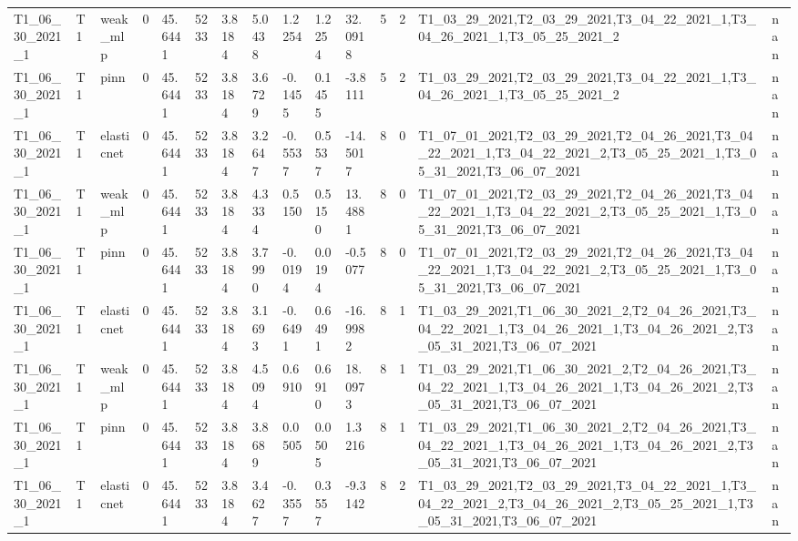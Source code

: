 \begin{table}[t]
\begin{tabular}{lllllllllllllll}
T1\_06\_30\_2021\_1 & T1 & weak\_mlp & 0 & 45.6441 & 5233 & 3.8184 & 5.0438 & 1.2254 & 1.2254 & 32.0918 & 5 & 2 & T1\_03\_29\_2021,T2\_03\_29\_2021,T3\_04\_22\_2021\_1,T3\_04\_26\_2021\_1,T3\_05\_25\_2021\_2 & nan \\
T1\_06\_30\_2021\_1 & T1 & pinn & 0 & 45.6441 & 5233 & 3.8184 & 3.6729 & -0.1455 & 0.1455 & -3.8111 & 5 & 2 & T1\_03\_29\_2021,T2\_03\_29\_2021,T3\_04\_22\_2021\_1,T3\_04\_26\_2021\_1,T3\_05\_25\_2021\_2 & nan \\
T1\_06\_30\_2021\_1 & T1 & elasticnet & 0 & 45.6441 & 5233 & 3.8184 & 3.2647 & -0.5537 & 0.5537 & -14.5017 & 8 & 0 & T1\_07\_01\_2021,T2\_03\_29\_2021,T2\_04\_26\_2021,T3\_04\_22\_2021\_1,T3\_04\_22\_2021\_2,T3\_05\_25\_2021\_1,T3\_05\_31\_2021,T3\_06\_07\_2021 & nan \\
T1\_06\_30\_2021\_1 & T1 & weak\_mlp & 0 & 45.6441 & 5233 & 3.8184 & 4.3334 & 0.5150 & 0.5150 & 13.4881 & 8 & 0 & T1\_07\_01\_2021,T2\_03\_29\_2021,T2\_04\_26\_2021,T3\_04\_22\_2021\_1,T3\_04\_22\_2021\_2,T3\_05\_25\_2021\_1,T3\_05\_31\_2021,T3\_06\_07\_2021 & nan \\
T1\_06\_30\_2021\_1 & T1 & pinn & 0 & 45.6441 & 5233 & 3.8184 & 3.7990 & -0.0194 & 0.0194 & -0.5077 & 8 & 0 & T1\_07\_01\_2021,T2\_03\_29\_2021,T2\_04\_26\_2021,T3\_04\_22\_2021\_1,T3\_04\_22\_2021\_2,T3\_05\_25\_2021\_1,T3\_05\_31\_2021,T3\_06\_07\_2021 & nan \\
T1\_06\_30\_2021\_1 & T1 & elasticnet & 0 & 45.6441 & 5233 & 3.8184 & 3.1693 & -0.6491 & 0.6491 & -16.9982 & 8 & 1 & T1\_03\_29\_2021,T1\_06\_30\_2021\_2,T2\_04\_26\_2021,T3\_04\_22\_2021\_1,T3\_04\_26\_2021\_1,T3\_04\_26\_2021\_2,T3\_05\_31\_2021,T3\_06\_07\_2021 & nan \\
T1\_06\_30\_2021\_1 & T1 & weak\_mlp & 0 & 45.6441 & 5233 & 3.8184 & 4.5094 & 0.6910 & 0.6910 & 18.0973 & 8 & 1 & T1\_03\_29\_2021,T1\_06\_30\_2021\_2,T2\_04\_26\_2021,T3\_04\_22\_2021\_1,T3\_04\_26\_2021\_1,T3\_04\_26\_2021\_2,T3\_05\_31\_2021,T3\_06\_07\_2021 & nan \\
T1\_06\_30\_2021\_1 & T1 & pinn & 0 & 45.6441 & 5233 & 3.8184 & 3.8689 & 0.0505 & 0.0505 & 1.3216 & 8 & 1 & T1\_03\_29\_2021,T1\_06\_30\_2021\_2,T2\_04\_26\_2021,T3\_04\_22\_2021\_1,T3\_04\_26\_2021\_1,T3\_04\_26\_2021\_2,T3\_05\_31\_2021,T3\_06\_07\_2021 & nan \\
T1\_06\_30\_2021\_1 & T1 & elasticnet & 0 & 45.6441 & 5233 & 3.8184 & 3.4627 & -0.3557 & 0.3557 & -9.3142 & 8 & 2 & T1\_03\_29\_2021,T2\_03\_29\_2021,T3\_04\_22\_2021\_1,T3\_04\_22\_2021\_2,T3\_04\_26\_2021\_2,T3\_05\_25\_2021\_1,T3\_05\_31\_2021,T3\_06\_07\_2021 & nan \\

\end{tabular}
\end{table}
